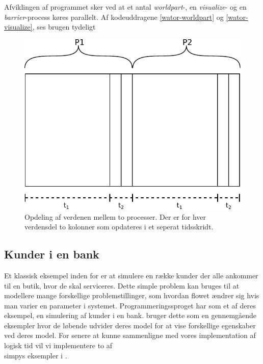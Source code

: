Afviklingen af programmet sker ved at et antal \emph{worldpart}-, en 
\emph{visualize}- og en \emph{barrier}-process køres parallelt. Af 
kodeuddragene \autoref{wator-worldpart} og \ref{wator-visualize}, ses brugen 
tydeligt 


\begin{figure}[hbtp] \begin{center}
  \includegraphics[scale=0.75]{images/wator}
  \caption{Opdeling af verdenen mellem to processer. Der er for hver verdensdel 
  to kolonner som opdateres i et seperat tidsskridt.}
  \label{fig:wator}
  \end{center}
\end{figure}

\subsection{Kunder i en bank}\label{bank-eksempel}
 Et klassisk eksempel inden for \des er at simulere  
en række kunder der alle ankommer til en butik, hvor de skal serviceres. Dette 
simple problem kan bruges til at modellere mange forskellige 
problemstillinger, som hvordan flowet ændrer sig hvis man varier en parameter 
i systemet. Programmeringssproget \simpy{} har som et af deres eksempel, en 
simulering af kunder i en bank. \simpy bruger dette som en gennemgående 
eksempler hvor de løbende udvider deres model for at vise forskellige 
egenskaber ved deres model. For senere at kunne sammenligne \simpy  med vores 
implementation af logisk tid vil vi implementere to af \\simpys eksempler i \pycsp.


